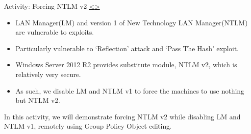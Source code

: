 \documentclass[12pt]{extarticle}
\newenvironment{instructionblock}{\Large\bgroup}{\egroup}
\begin{document}
\pagebreak
\begin{slide}{ Activity: Forcing NTLM v2 }{\hyperref[slide 15]{\textless}\hyperref[slide 17]{\textgreater}}
	\vskip 5pt
	\begin{instructionblock}
		\begin{itemize}
			\item LAN Manager(LM) and version 1 of New Technology LAN Manager(NTLM) are vulnerable to exploits.
			\item Particularly vulnerable to `Reflection' attack and `Pass The Hash' exploit.
			\item Windows Server 2012 R2 provides substitute module, NTLM v2, which is relatively very secure.
			\item As such, we disable LM and NTLM v1 to force the machines to use nothing but NTLM v2.
		\end{itemize}
	\end{instructionblock}
\end{slide}


\vspace{2mm}
\noindent
In this activity, we will demonstrate forcing NTLM v2 while disabling LM and NTLM v1, remotely using Group Policy Object editing. 
\end{document}
